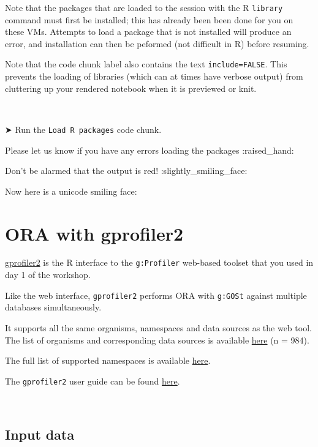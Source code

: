 \documentclass[
]{book}
\begin{document}
Note that the packages that are loaded to the session with the R \texttt{library} command must first be installed; this has already been been done for you on these VMs. Attempts to load a package that is not installed will produce an error, and installation can then be peformed (not difficult in R) before resuming.

Note that the code chunk label also contains the text \texttt{include=FALSE}. This prevents the loading of libraries (which can at times have verbose output) from cluttering up your rendered notebook when it is previewed or knit.

~

➤ Run the \texttt{Load\ R\ packages} code chunk.

Please let us know if you have any errors loading the packages :raised\_hand:

Don't be alarmed that the output is {red}! :slightly\_smiling\_face:

Now here is a unicode smiling face:

\hypertarget{ora-with-gprofiler2}{%
\chapter{ORA with gprofiler2}\label{ora-with-gprofiler2}}

\href{https://cran.r-project.org/web/packages/gprofiler2/index.html}{gprofiler2} is the R interface to the \texttt{g:Profiler} web-based toolset that you used in day 1 of the workshop.

Like the web interface, \texttt{gprofiler2} performs ORA with \texttt{g:GOSt} against multiple databases simultaneously.

It supports all the same organisms, namespaces and data sources as the web tool. The list of organisms and corresponding data sources is available \href{https://biit.cs.ut.ee/gprofiler/page/organism-list}{here} (n = 984).

The full list of supported namespaces is available \href{https://biit.cs.ut.ee/gprofiler/page/namespaces-list}{here}.

The \texttt{gprofiler2} user guide can be found \href{https://cran.r-project.org/web/packages/gprofiler2/gprofiler2.pdf}{here}.

~

\hypertarget{input-data-3}{%
\section{Input data}\label{input-data-3}}
\end{document}
